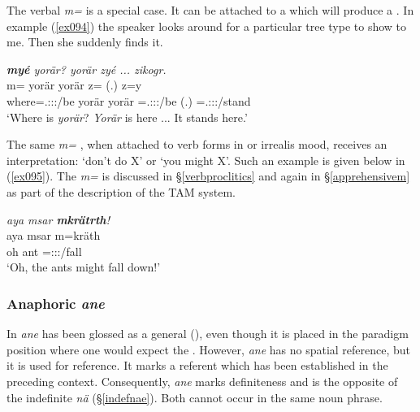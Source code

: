 The verbal  \emph{m=} is a special case. It can be attached to a  which will produce a . In example (\ref{ex094}) the speaker looks around for a particular tree type to show to me. Then she suddenly finds it.

\begin{exe}
	\ex \emph{\textbf{myé} yorär? yorär zyé ... zikogr.}\\
	\gll m= yorär yorär z= (.) z=y\\
	where=\Tsg.\Masc:\Sbj:\Nonpast:\Ipfv/be yorär yorär \Prox=\Tsg.\Masc:\Sbj:\Nonpast:\Ipfv/be (.) \Prox=\Tsg.\Masc:\Sbj:\Nonpast:\Stat/stand\\
	\trans `Where is \emph{yorär}? \emph{Yorär} is here ... It stands here.'\\ 
	\label{ex094}
\end{exe}

The same \emph{m=} , when attached to verb forms in  or irrealis mood, receives an  interpretation: `don't do X' or `you might X'. Such an example is given below in (\ref{ex095}). The \emph{m=}  is discussed in \S{}\ref{verbproclitics} and again in \S{}\ref{apprehensivem} as part of the description of the TAM system.

\begin{exe}
	\ex \emph{aya msar \textbf{mkrätrth}!}\\
	\gll aya msar m=kräth\\
	oh ant \Appr{}=\Stpl:\Sbj:\Irr:\Pfv/fall\\
	\trans `Oh, the ants might fall down!' 
	\label{ex095}
\end{exe}

\subsubsection{Anaphoric \emph{ane}} \label{anaphoric-dem}

In  \emph{ane} has been glossed as a general  (\Dem{}), even though it is placed in the paradigm position where one would expect the  . However, \emph{ane} has no spatial reference, but it is used for  reference. It marks a referent which has been established in the preceding context. Consequently, \emph{ane} marks definiteness and is the opposite of the indefinite \emph{nä} (\S{}\ref{indefnae}). Both cannot occur in the same noun phrase.%

